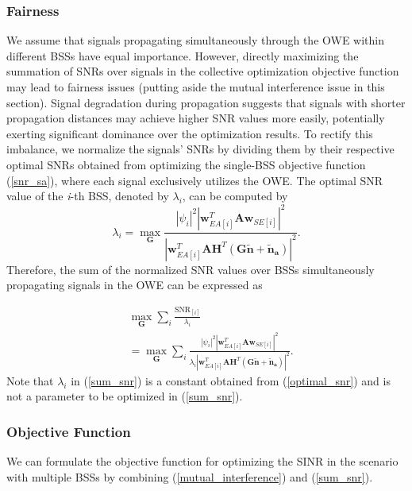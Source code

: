 \subsubsection{Fairness}

We assume that signals propagating simultaneously through the OWE within different BSSs have equal importance. However, directly maximizing the summation of SNRs over signals in the collective optimization objective function may lead to fairness issues (putting aside the mutual interference issue in this section). Signal degradation during propagation suggests that signals with shorter propagation distances may achieve higher SNR values more easily, potentially exerting significant dominance over the optimization results. 
To rectify this imbalance, we normalize the signals' SNRs by dividing them by their respective optimal SNRs obtained from optimizing the single-BSS objective function (\ref{snr_sa}), where each signal exclusively utilizes the OWE.
The optimal SNR value of the \textit{i}-th BSS, denoted by $\lambda_i$, can be computed by
\begin{equation}
\label{optimal_snr}
\lambda_i = \max_{\mathbf{G}}
\frac{{{{|\psi_i|^2\left|\mathbf{w}_{EA[i]}^T\mathbf{A}{\mathbf{w}_{SE[i]}} \right|}^2}}}{{{{\left| {\mathbf{w}_{EA[i]}^T\mathbf{A}{\mathbf{H}^T}\left( {\mathbf{G\tilde n + }{{\mathbf{\tilde n}}_\mathbf{a}}} \right)} \right|}^2}}} \text{.}
\end{equation}
Therefore, the sum of the normalized SNR values over BSSs simultaneously propagating signals in the OWE can be expressed as

\begin{equation}
\label{sum_snr}
\begin{aligned}
&\max_\mathbf{G} \sum_i \frac{\text{SNR}_{[i]}}{\lambda_i} \\
& = \max_\mathbf{G} \sum_i
\frac{{{{|\psi_i|^2\left|\mathbf{w}_{EA[i]}^T\mathbf{A}{\mathbf{w}_{SE[i]}} \right|}^2}}}{\lambda_i{{{\left| {\mathbf{w}_{EA[i]}^T\mathbf{A}{\mathbf{H}^T}\left( {\mathbf{G\tilde n + }{{\mathbf{\tilde n}}_\mathbf{a}}} \right)} \right|}^2}}} \text{.}
\end{aligned}
\end{equation}
Note that $\lambda_i$ in (\ref{sum_snr}) is a constant obtained from (\ref{optimal_snr}) and is not a parameter to be optimized in (\ref{sum_snr}). 

\subsubsection{Objective Function}
We can formulate the objective function for optimizing the SINR in the scenario with multiple BSSs by combining (\ref{mutual_interference}) and (\ref{sum_snr}).

